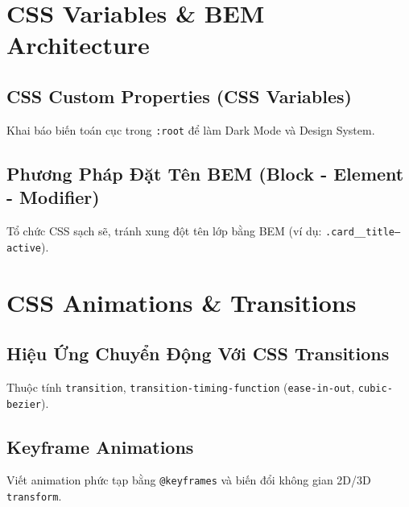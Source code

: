 \documentclass[11pt,oneside]{book}
\newcommand{\codeinline}[1]{\textcolor{accentOrange}{\texttt{#1}}}
\begin{document}
\chapter{CSS Variables \& BEM Architecture}
\label{chap:css_variables_bem}

\section{CSS Custom Properties (CSS Variables)}
Khai báo biến toán cục trong \codeinline{:root} để làm Dark Mode và Design System.

\section{Phương Pháp Đặt Tên BEM (Block - Element - Modifier)}
Tổ chức CSS sạch sẽ, tránh xung đột tên lớp bằng BEM (ví dụ: \codeinline{.card\_\_title--active}).


\chapter{CSS Animations \& Transitions}
\label{chap:animations_transitions}

\section{Hiệu Ứng Chuyển Động Với CSS Transitions}
Thuộc tính \codeinline{transition}, \codeinline{transition-timing-function} (\codeinline{ease-in-out}, \codeinline{cubic-bezier}).

\section{Keyframe Animations}
Viết animation phức tạp bằng \codeinline{@keyframes} và biến đổi không gian 2D/3D \codeinline{transform}.
\end{document}
